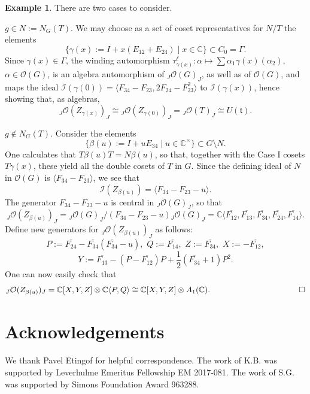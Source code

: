 \documentclass{amsart}
\numberwithin{equation}{section}
\theoremstyle{definition}
\newtheorem{example}[theorem]{Example}
\begin{document}
\begin{example}
 There are two cases to consider.

 $g \in N:=N_G(T)$. We may choose as a set of coset representatives for $N/T$ the elements 
$$ \{\gamma(x) := I + x(E_{12} + E_{24})\mid x \in \mathbb{C} \} \subset 
C_0 = \Gamma.$$
Since $\gamma(x) \in \Gamma$, the winding automorphism $\tau^{\ell}_{\gamma(x)}: \alpha \mapsto \sum \alpha_1\gamma(x)(\alpha_2)$, $\alpha \in \mathcal{O}(G)$, is an algebra automorphism of ${}_J\mathcal{O}(G)_J$, as well as of $\mathcal{O}(G)$, and maps the ideal $\mathcal{I}(\gamma(0)) = \langle F_{34} - F_{23}, 2F_{24} - F_{23}^2 \rangle$ to $\mathcal{I}(\gamma(x))$, hence showing that, as algebras,
$${}_J\mathcal{O}(Z_{\gamma(x)})_J \cong {}_J\mathcal{O}(Z_{\gamma(0)})_J= {}_J\mathcal{O}(T)_J \cong U(\mathfrak{t}).$$

 $g \notin N_G(T)$. Consider the elements
$$ \{\beta(u) := I + uE_{34}\mid  u \in \mathbb{C}^{\times} \} \subset G \setminus N.$$
One calculates that $T\beta(u)T  = N\beta(u)$, so that, together with the Case I cosets $T\gamma(x)$, these yield all the double cosets of $T$ in $G$. Since the defining ideal of $N$ in $\mathcal{O}(G)$ is $\langle F_{34} - F_{23} \rangle$, we see that 
$$\mathcal{I}(Z_{\beta(u)}) 
= 
\langle F_{34} - F_{23} - u \rangle. $$
The generator $F_{34} - F_{23} - u$ is central in ${}_J\mathcal{O}(G)_J$, so that 
$${}_J\mathcal{O}(Z_{\beta(u)})_J = {}_J\mathcal{O}(G)_J/(F_{34} - F_{23} - u){}_J\mathcal{O}(G)_J =  \mathbb{C}\langle \overline{F_{12}}, \overline{F_{13}}, \overline{F_{34}}, \overline{F_{24}}, \overline{F_{14}}\rangle.$$
Define new generators for ${}_J\mathcal{O}(Z_{\beta(u)})_J$ as follows:
$$ 
P := \overline{F_{24}} - \overline{F_{34}}(\overline{F_{34}} - u),\,\, Q:= \overline{F_{14}},\,\,
Z := \overline{F_{34}}, \,\, X :=  -\overline{F_{12}},$$ 
$$Y :=  \overline{F_{13}} - (P - \overline{F_{12}})P + \frac{1}{2}(\overline{F_{34}} + 1)P^2.$$
One can now easily check that
$$ {}_J\mathcal{O}(Z_{\beta(u)})_J =  \mathbb{C}[X,Y,Z] \otimes \mathbb{C}\langle P,Q\rangle \cong \mathbb{C}[X,Y,Z] \otimes A_1(\mathbb{C}).\quad\quad\quad\quad\quad\quad\quad\quad\quad \qed$$
\end{example}

\section{Acknowledgements} 

We thank Pavel Etingof for helpful correspondence. The work of K.B. was supported by Leverhulme Emeritus Fellowship EM 2017-081. The work of S.G. was supported by Simons Foundation Award 963288.
\end{document}

